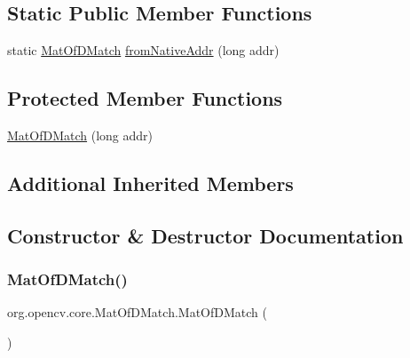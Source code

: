 \subsection*{Static Public Member Functions}
\begin{DoxyCompactItemize}
\item 
static \mbox{\hyperlink{classorg_1_1opencv_1_1core_1_1_mat_of_d_match}{Mat\+Of\+D\+Match}} \mbox{\hyperlink{classorg_1_1opencv_1_1core_1_1_mat_of_d_match_a60ad9cad3c58ba654e12f681692904b8}{from\+Native\+Addr}} (long addr)
\end{DoxyCompactItemize}
\subsection*{Protected Member Functions}
\begin{DoxyCompactItemize}
\item 
\mbox{\hyperlink{classorg_1_1opencv_1_1core_1_1_mat_of_d_match_a2ae4a7abe7ceb5b92646482e9b6051f0}{Mat\+Of\+D\+Match}} (long addr)
\end{DoxyCompactItemize}
\subsection*{Additional Inherited Members}


\subsection{Constructor \& Destructor Documentation}
\mbox{\label{classorg_1_1opencv_1_1core_1_1_mat_of_d_match_af5a436778dbe9a483a3605fa7e5673f5}} 
\subsubsection{\texorpdfstring{Mat\+Of\+D\+Match()}{MatOfDMatch()}\hspace{0.1cm}{\footnotesize\ttfamily [1/4]}}
{\footnotesize\ttfamily org.\+opencv.\+core.\+Mat\+Of\+D\+Match.\+Mat\+Of\+D\+Match (\begin{DoxyParamCaption}{ }\end{DoxyParamCaption})}

